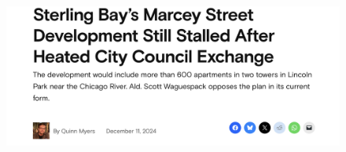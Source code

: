 \begin{frame}
\begin{minipage}{0.48\textwidth}
\begin{figure}
			\vspace{20pt}
			\includegraphics[width=\textwidth]{images/sterling_bay_fight.png}
        \end{figure}
        \end{minipage}
\end{frame}